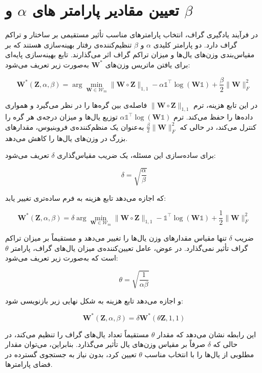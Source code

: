 \documentclass[10pt,twocolumn,a4paper]{article}
\begin{document}
	\section{تعیین مقادیر پارامتر های $\alpha$ و $\beta$}
	در فرآیند یادگیری گراف، انتخاب پارامترهای مناسب تأثیر مستقیمی بر ساختار و تراکم گراف دارد. دو پارامتر کلیدی \( \alpha \) و \( \beta \) تنظیم‌کننده‌ی رفتار بهینه‌سازی هستند که بر مقیاس‌بندی وزن‌های یال‌ها و میزان تراکم گراف اثر می‌گذارند. تابع بهینه‌سازی پایه‌ای برای یافتن ماتریس وزن‌های \( \bm{W}^* \) به‌صورت زیر تعریف می‌شود:

	\[
		\bm{W}^*(\bm{Z}, \alpha, \beta) = \arg \min_{\bm{W} \in \mathcal{W}_m} \|\bm{W} \circ \bm{Z}\|_{1,1} - \alpha \mathds{1}^\top \log(\bm{W} \mathds{1}) + \frac{\beta}{2} \|\bm{W}\|_F^2
	\]

	در این تابع هزینه، ترم \( \|\bm{W} \circ \bm{Z}\|_{1,1} \) فاصله‌ی بین گره‌ها را در نظر می‌گیرد و همواری داده‌ها را حفظ می‌کند. ترم \( \alpha \mathds{1}^\top \log(\bm{W} \mathds{1}) \) توزیع یال‌ها و میزان درجه‌ی هر گره را کنترل می‌کند، در حالی که \( \frac{\beta}{2} \|\bm{W}\|_F^2 \) به‌عنوان یک منظم‌کننده‌ی فروبنیوس، مقدارهای بزرگ در وزن‌های یال‌ها را کاهش می‌دهد.

	برای ساده‌سازی این مسئله، یک ضریب مقیاس‌گذاری \( \delta \) تعریف می‌شود:

	\[
		\delta = \sqrt{\frac{\alpha}{\beta}}
	\]

	که اجازه می‌دهد تابع هزینه به فرم ساده‌تری تغییر یابد:

	\[
		\bm{W}^*(\bm{Z}, \alpha, \beta) = \delta \arg \min_{\bm{W} \in \mathcal{W}_m} \|\bm{W} \circ \bm{Z}\|_{1,1} - \mathds{1}^\top \log(\bm{W} \mathds{1}) + \frac{1}{2} \|\bm{W}\|_F^2
	\]

	ضریب \( \delta \) تنها مقیاس مقدارهای وزن یال‌ها را تغییر می‌دهد و مستقیماً بر میزان تراکم گراف تأثیر نمی‌گذارد. در عوض، عامل تعیین‌کننده‌ی میزان یال‌های گراف، پارامتر \( \theta \) است که به‌صورت زیر تعریف می‌شود:

	\[
		\theta = \sqrt{\frac{1}{\alpha \beta}}
	\]

	و اجازه می‌دهد تابع هزینه به شکل نهایی زیر بازنویسی شود:

	\[
		\bm{W}^*(\bm{Z}, \alpha, \beta) = \delta \bm{W}^*(\theta \bm{Z}, 1, 1)
	\]

	این رابطه نشان می‌دهد که مقدار \( \theta \) مستقیماً تعداد یال‌های گراف را تنظیم می‌کند، در حالی که \( \delta \) صرفاً بر مقیاس وزن‌های یال تأثیر می‌گذارد. بنابراین، می‌توان مقدار مطلوبی از یال‌ها را با انتخاب مناسب \( \theta \) تعیین کرد، بدون نیاز به جستجوی گسترده در فضای پارامترها.
\end{document}
